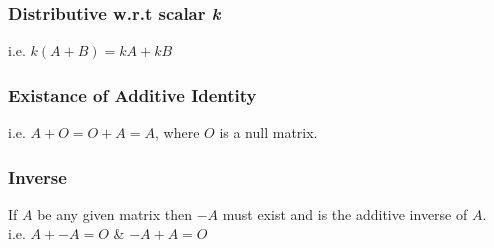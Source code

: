 \documentclass{article}
\begin{document}
	\subsubsection*{Distributive w.r.t scalar \textit{k}}
	i.e. $ k(A+B) = kA + kB $
	
	\subsubsection*{Existance of Additive Identity}
	i.e. $ A+O = O+A = A $, where $ O $ is a null matrix.
	
	\subsubsection*{Inverse}
	If $ A $ be any given matrix then $ -A $ must exist and is the additive inverse of $ A $. \\
	i.e. $ A + -A = O $ \hspace{0.2cm} \& \hspace{0.2cm} $ -A + A = O $
	\newpage
		
\end{document}
